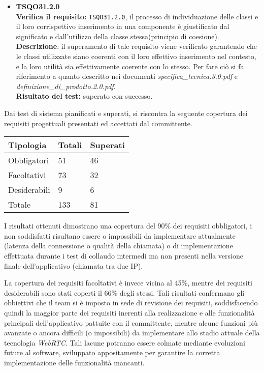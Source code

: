 \begin{itemize}
\item \textbf{TSQO31.2.0}\\
\textbf{Verifica il requisito:} \texttt{TSQO31.2.0}, il processo di individuazione delle classi e il loro corrispettivo inserimento in una componente è giustificato dal significato e dall'utilizzo della classe stessa(principio di coesione).
\textbf{Descrizione}: il superamento di tale requisito viene verificato garantendo che le classi utilizzate siano coerenti con il loro effettivo inserimento nel contesto, e la loro utilità sia effettivamente coerente con lo stesso. Per fare ciò si fa riferimento a quanto descritto nei documenti \textit{specifica\_tecnica.3.0.pdf} e \textit{definizione\_di\_prodotto.2.0.pdf}.\\
\textbf{Risultato del test:} superato con successo.

\end{itemize}

Dai test di sistema pianificati e superati, si riscontra la seguente copertura dei requisiti progettuali presentati ed accettati dal committente.

\begin{center}
\begin{longtable}{p{}ll}
\toprule Tipologia & Totali  & Superati\\
\midrule

Obbligatori & 51 & 46\\
Facoltativi & 73 & 32\\
Desiderabili & 9 & 6\\
\bottomrule\rowcolor{white}
Totale &133 & 81\\
\end{longtable}
\end{center}

I risultati ottenuti dimostrano una copertura del 90\% dei requisiti obbligatori, i non soddisfatti risultano essere o impossibili da implementare attualmente (latenza della connessione o qualità della chiamata) o di implementazione effettuata durante i test di collaudo intermedi ma non presenti nella versione finale dell'applicativo (chiamata tra due IP).

La copertura dei requisiti facoltativi è invece vicina al 45\%, mentre dei requisiti desiderabili sono stati coperti il 66\% degli stessi.
Tali risultati confermano gli obbiettivi che il team si è imposto in sede di revisione dei requisiti, soddisfacendo quindi la maggior parte dei requisiti inerenti alla realizzazione e alle funzionalità principali dell'applicativo pattuite con il committente, mentre alcune funzioni più avanzate o ancora difficili (o impossibili) da implementare allo stadio attuale della tecnologia \textit{WebRTC}. Tali lacune potranno essere colmate mediante evoluzioni future al software, sviluppato appositamente per garantire la corretta implementazione delle funzionalità mancanti.

